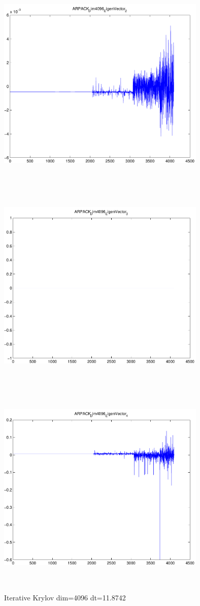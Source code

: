 \documentclass[9pt]{article}
\theoremstyle{plain}
\theoremstyle{definition}
\theoremstyle{remark}
\numberwithin{equation}{section}
\begin{document}
\includegraphics[width=10.0cm,height=10.0cm]{ARPACK_Dim4096_EigenVector_2.pdf}

\includegraphics[width=10.0cm,height=10.0cm]{ARPACK_Dim4096_EigenVector_3.pdf}

\includegraphics[width=10.0cm,height=10.0cm]{ARPACK_Dim4096_EigenVector_4.pdf}

Iterative Krylov dim=4096 dt=11.8742
\end{document}

